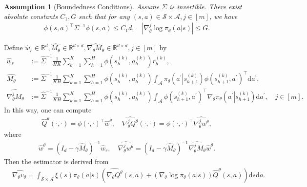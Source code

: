 \documentclass{article}
\newtheorem{assumption}{Assumption}[section]
\numberwithin{equation}{section}
\begin{document}
\begin{assumption}[Boundedness Conditions]\label{Boundedness_Conditions_homo}
	Assume $\Sigma$ is invertible. There exist absolute constants $C_1, G$ such that for any $(s,a)\in \mathcal{S}\times\mathcal{A},j\in[m]$, we have
	\begin{align*}
		\phi(s,a)^\top\Sigma^{-1}\phi(s,a)\leq C_1 d,\quad\left\vert\nabla_\theta^j\log\pi_\theta(a\vert s)\right\vert\leq G.
	\end{align*}
\end{assumption}
Define $\widehat{w}_r\in\mathbb{R}^{d},\widehat{M_\theta}\in\mathbb{R}^{d\times d},\widehat{\nabla_\theta M_\theta}\in\mathbb{R}^{d\times d},j\in[m]$ by
\begin{align*}
	\widehat{w}_r&:=\widehat{\Sigma}^{-1}\frac{1}{HK}\sum_{k=1}^K\sum_{h=1}^H\phi\left(s_h^{(k)},a_h^{(k)}\right)r_h^{(k)},\\
	\widehat{M_\theta}&:=\widehat{\Sigma}^{-1}\frac{1}{KH}\sum_{k=1}^K\sum_{h=1}^H\phi\left(s_h^{(k)}, a_h^{(k)}\right)\int_{\mathcal{A}}\pi_\theta\left(a^\prime\left\vert s_{h+1}^{(k)}\right.\right)\phi\left(s_{h+1}^{(k)}, a^\prime\right)^\top\mathrm{d}a^\prime,\\
	\widehat{\nabla_\theta^j M_\theta}&:=\widehat{\Sigma}^{-1}\frac{1}{KH}\sum_{k=1}^K\sum_{h=1}^H\phi\left(s_h^{(k)},a_h^{(k)}\right)\int_{\mathcal{A}}\phi\left(s_{h+1}^{(k)}, a^\prime\right)^\top\nabla_\theta\pi_\theta\left(a^\prime\left\vert s_{h+1}^{(k)}\right.\right)\mathrm{d}a^\prime,\quad j\in[m].
\end{align*}
In this way, one can compute 
\begin{align*}
\widehat{Q}^\theta(\cdot,\cdot)=\phi(\cdot,\cdot)^\top\widehat{w}^\theta,\quad\widehat{\nabla_\theta^j Q^\theta}(\cdot,\cdot)=\phi(\cdot,\cdot)^\top\widehat{\nabla_\theta^j w^\theta},
\end{align*}
where 
\begin{align*}
\widehat{w}^\theta=\left(I_d-\gamma\widehat{M}_\theta\right)^{-1}\widehat{w}_r,\quad\widehat{\nabla_\theta^j w^\theta}=\left(I_d-\gamma\widehat{M}_\theta\right)^{-1}\widehat{\nabla_\theta^j M_\theta}\widehat{w}^\theta.
\end{align*}
Then the estimator is derived from
\begin{align*}
    &\widehat{\nabla_\theta v_\theta}=\int_{\mathcal{S}\times\mathcal{A}}\xi(s)\pi_\theta(a\vert s)\left(\widehat{\nabla_\theta Q^\theta}(s,a)+\left(\nabla_\theta\log\pi_\theta(a\vert s)\right)\widehat{Q}^\theta(s,a)\right)\mathrm{d}s\mathrm{d}a.
\end{align*}
\end{document}
